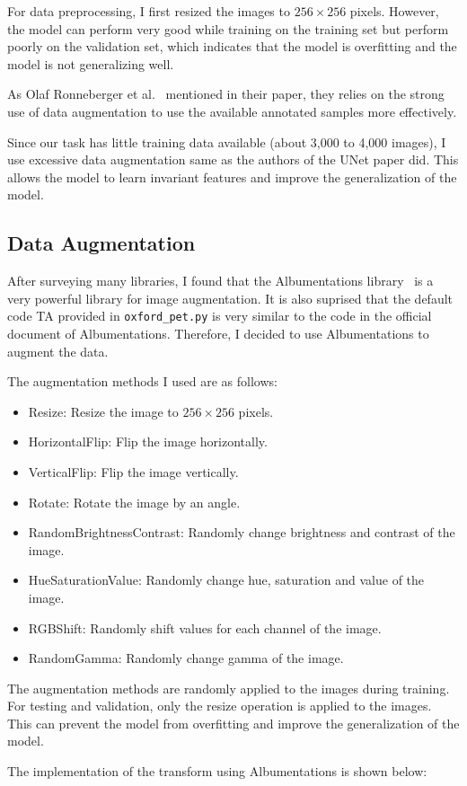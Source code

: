 For data preprocessing, I first resized the images to $256 \times 256$ pixels.
However, the model can perform very good while training on the training set but perform poorly on the validation set, which indicates that the model is overfitting and the model is not generalizing well.

As Olaf Ronneberger et al.~\cite{UNet} mentioned in their paper, they relies on the strong use of data augmentation to use the available annotated samples more effectively.

Since our task has little training data available (about 3,000 to 4,000 images), I use excessive data augmentation same as the authors of the UNet paper did.
This allows the model to learn invariant features and improve the generalization of the model.

\subsection{Data Augmentation}

After surveying many libraries, I found that the Albumentations library~\cite{Albumentations} is a very powerful library for image augmentation.
It is also suprised that the default code TA provided in \texttt{oxford\_pet.py} is very similar to the code in the official document of Albumentations.
Therefore, I decided to use Albumentations to augment the data.

The augmentation methods I used are as follows:

\begin{itemize}
    \item Resize: Resize the image to $256 \times 256$ pixels.
    \item HorizontalFlip: Flip the image horizontally.
    \item VerticalFlip: Flip the image vertically.
    \item Rotate: Rotate the image by an angle.
    \item RandomBrightnessContrast: Randomly change brightness and contrast of the image.
    \item HueSaturationValue: Randomly change hue, saturation and value of the image.
    \item RGBShift: Randomly shift values for each channel of the image.
    \item RandomGamma: Randomly change gamma of the image.
\end{itemize}

The augmentation methods are randomly applied to the images during training.
For testing and validation, only the resize operation is applied to the images.
This can prevent the model from overfitting and improve the generalization of the model.

The implementation of the transform using Albumentations is shown below:

\inputminted[firstline=121]{python}{../src/oxford_pet.py}
